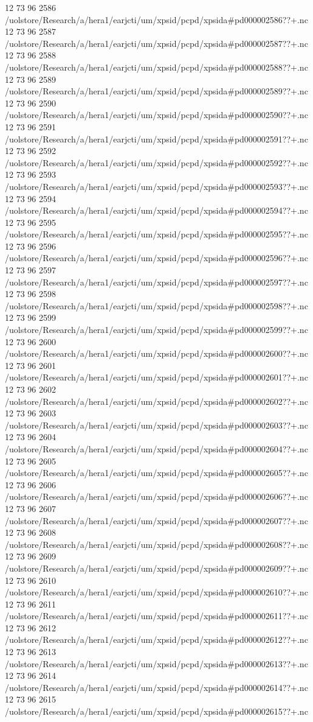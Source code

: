 12 73 96
2586
/uolstore/Research/a/hera1/earjcti/um/xpsid/pcpd/xpsida#pd000002586??+.nc
12 73 96
2587
/uolstore/Research/a/hera1/earjcti/um/xpsid/pcpd/xpsida#pd000002587??+.nc
12 73 96
2588
/uolstore/Research/a/hera1/earjcti/um/xpsid/pcpd/xpsida#pd000002588??+.nc
12 73 96
2589
/uolstore/Research/a/hera1/earjcti/um/xpsid/pcpd/xpsida#pd000002589??+.nc
12 73 96
2590
/uolstore/Research/a/hera1/earjcti/um/xpsid/pcpd/xpsida#pd000002590??+.nc
12 73 96
2591
/uolstore/Research/a/hera1/earjcti/um/xpsid/pcpd/xpsida#pd000002591??+.nc
12 73 96
2592
/uolstore/Research/a/hera1/earjcti/um/xpsid/pcpd/xpsida#pd000002592??+.nc
12 73 96
2593
/uolstore/Research/a/hera1/earjcti/um/xpsid/pcpd/xpsida#pd000002593??+.nc
12 73 96
2594
/uolstore/Research/a/hera1/earjcti/um/xpsid/pcpd/xpsida#pd000002594??+.nc
12 73 96
2595
/uolstore/Research/a/hera1/earjcti/um/xpsid/pcpd/xpsida#pd000002595??+.nc
12 73 96
2596
/uolstore/Research/a/hera1/earjcti/um/xpsid/pcpd/xpsida#pd000002596??+.nc
12 73 96
2597
/uolstore/Research/a/hera1/earjcti/um/xpsid/pcpd/xpsida#pd000002597??+.nc
12 73 96
2598
/uolstore/Research/a/hera1/earjcti/um/xpsid/pcpd/xpsida#pd000002598??+.nc
12 73 96
2599
/uolstore/Research/a/hera1/earjcti/um/xpsid/pcpd/xpsida#pd000002599??+.nc
12 73 96
2600
/uolstore/Research/a/hera1/earjcti/um/xpsid/pcpd/xpsida#pd000002600??+.nc
12 73 96
2601
/uolstore/Research/a/hera1/earjcti/um/xpsid/pcpd/xpsida#pd000002601??+.nc
12 73 96
2602
/uolstore/Research/a/hera1/earjcti/um/xpsid/pcpd/xpsida#pd000002602??+.nc
12 73 96
2603
/uolstore/Research/a/hera1/earjcti/um/xpsid/pcpd/xpsida#pd000002603??+.nc
12 73 96
2604
/uolstore/Research/a/hera1/earjcti/um/xpsid/pcpd/xpsida#pd000002604??+.nc
12 73 96
2605
/uolstore/Research/a/hera1/earjcti/um/xpsid/pcpd/xpsida#pd000002605??+.nc
12 73 96
2606
/uolstore/Research/a/hera1/earjcti/um/xpsid/pcpd/xpsida#pd000002606??+.nc
12 73 96
2607
/uolstore/Research/a/hera1/earjcti/um/xpsid/pcpd/xpsida#pd000002607??+.nc
12 73 96
2608
/uolstore/Research/a/hera1/earjcti/um/xpsid/pcpd/xpsida#pd000002608??+.nc
12 73 96
2609
/uolstore/Research/a/hera1/earjcti/um/xpsid/pcpd/xpsida#pd000002609??+.nc
12 73 96
2610
/uolstore/Research/a/hera1/earjcti/um/xpsid/pcpd/xpsida#pd000002610??+.nc
12 73 96
2611
/uolstore/Research/a/hera1/earjcti/um/xpsid/pcpd/xpsida#pd000002611??+.nc
12 73 96
2612
/uolstore/Research/a/hera1/earjcti/um/xpsid/pcpd/xpsida#pd000002612??+.nc
12 73 96
2613
/uolstore/Research/a/hera1/earjcti/um/xpsid/pcpd/xpsida#pd000002613??+.nc
12 73 96
2614
/uolstore/Research/a/hera1/earjcti/um/xpsid/pcpd/xpsida#pd000002614??+.nc
12 73 96
2615
/uolstore/Research/a/hera1/earjcti/um/xpsid/pcpd/xpsida#pd000002615??+.nc
